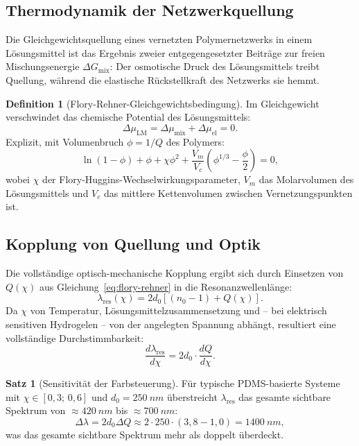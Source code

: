 ﻿\documentclass[a4paper,12pt]{scrreprt}
\theoremstyle{definition}
\newtheorem{definition}{Definition}[section]
\newtheorem{satz}{Satz}[section]
\begin{document}
\subsection{Thermodynamik der Netzwerkquellung}

Die Gleichgewichtsquellung eines vernetzten Polymernetzwerks in einem
Lösungsmittel ist das Ergebnis zweier entgegengesetzter Beiträge zur freien
Mischungsenergie $\Delta G_{\mathrm{mix}}$: Der osmotische Druck des Lösungsmittels
treibt Quellung, während die elastische Rückstellkraft des Netzwerks sie hemmt.

\begin{definition}[Flory-Rehner-Gleichgewichtsbedingung]
  Im Gleichgewicht verschwindet das chemische Potential des Lösungsmittels:
  \begin{equation}
    \Delta\mu_{\mathrm{LM}} = \Delta\mu_{\mathrm{mix}} + \Delta\mu_{\mathrm{el}} = 0.
  \end{equation}
  Explizit, mit Volumenbruch $\phi = 1/Q$ des Polymers:
  \begin{equation}
    \ln(1-\phi) + \phi + \chi\phi^2 + \frac{V_m}{V_c}\left(\phi^{1/3} - \frac{\phi}{2}\right) = 0,
    \label{eq:flory-rehner}
  \end{equation}
  wobei $\chi$ der Flory-Huggins-Wechselwirkungsparameter, $V_m$ das
  Molarvolumen des Lösungsmittels und $V_c$ das mittlere Kettenvolumen zwischen
  Vernetzungspunkten ist.
\end{definition}

\subsection{Kopplung von Quellung und Optik}

Die vollständige optisch-mechanische Kopplung ergibt sich durch Einsetzen
von $Q(\chi)$ aus Gleichung~\eqref{eq:flory-rehner} in die Resonanzwellenlänge:
\begin{equation}
  \lambda_\mathrm{res}(\chi) = 2 d_0 \left[(n_0 - 1) + Q(\chi)\right].
\end{equation}
Da $\chi$ von Temperatur, Lösungsmittelzusammensetzung und -- bei elektrisch
sensitiven Hydrogelen -- von der angelegten Spannung abhängt, resultiert eine
vollständige Durchstimmbarkeit:
\begin{equation}
  \frac{d\lambda_\mathrm{res}}{d\chi} = 2d_0 \cdot \frac{dQ}{d\chi}.
\end{equation}

\begin{satz}[Sensitivität der Farbsteuerung]
  Für typische PDMS-basierte Systeme mit $\chi \in [0{,}3;\, 0{,}6]$ und
  $d_0 = \SI{250}{nm}$ überstreicht $\lambda_\mathrm{res}$ das gesamte
  sichtbare Spektrum von $\approx \SI{420}{nm}$ bis $\approx \SI{700}{nm}$:
  \begin{equation}
    \Delta\lambda = 2d_0 \Delta Q \approx 2 \cdot 250 \cdot (3{,}8 - 1{,}0)
    = \SI{1400}{nm},
  \end{equation}
  was das gesamte sichtbare Spektrum mehr als doppelt überdeckt.
\end{satz}
\end{document}
